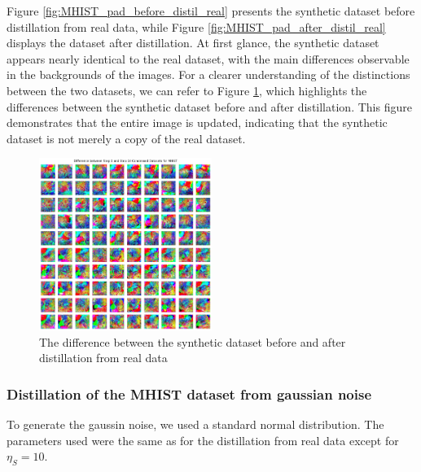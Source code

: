 \documentclass[onecolumn]{IEEEtran}
\begin{document}
Figure \ref{fig:MHIST_pad_before_distil_real} presents the synthetic dataset before distillation from real data, while Figure \ref{fig:MHIST_pad_after_distil_real} displays the dataset after distillation. At first glance, the synthetic dataset appears nearly identical to the real dataset, with the main differences observable in the backgrounds of the images. For a clearer understanding of the distinctions between the two datasets, we can refer to Figure \ref{fig:MHIST_2_diff_real}, which highlights the differences between the synthetic dataset before and after distillation. This figure demonstrates that the entire image is updated, indicating that the synthetic dataset is not merely a copy of the real dataset.

\begin{figure}[H]
    \centering
    \includegraphics[width=0.5\textwidth]{images/MHIST_2_diff_real.png}
    \caption{The difference between the synthetic dataset before and after distillation from real data}
    \label{fig:MHIST_2_diff_real}
\end{figure}

\subsubsection{Distillation of the MHIST dataset from gaussian noise}
To generate the gaussin noise, we used a standard normal distribution. The parameters used were the same as for the distillation from real data except for $\eta_S = 10$.
\end{document}
